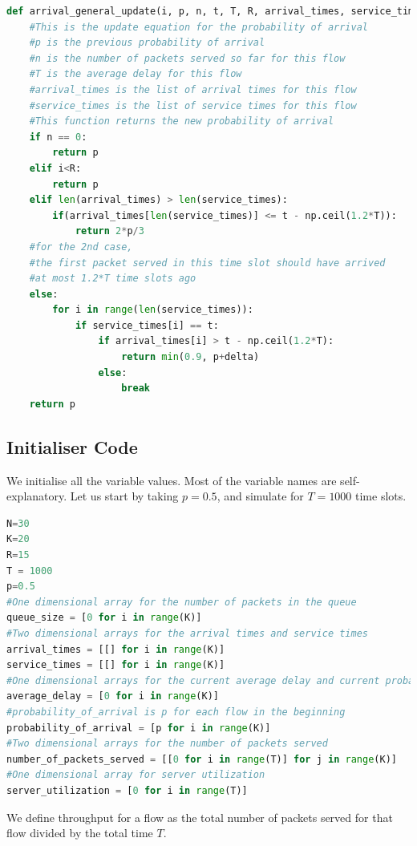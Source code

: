 \documentclass[11pt, a4paper]{article}
\begin{document}
\begin{lstlisting}[language = Python]
def arrival_general_update(i, p, n, t, T, R, arrival_times, service_times, delta):
    #This is the update equation for the probability of arrival
    #p is the previous probability of arrival
    #n is the number of packets served so far for this flow
    #T is the average delay for this flow
    #arrival_times is the list of arrival times for this flow
    #service_times is the list of service times for this flow
    #This function returns the new probability of arrival
    if n == 0:
        return p
    elif i<R:
        return p
    elif len(arrival_times) > len(service_times):
        if(arrival_times[len(service_times)] <= t - np.ceil(1.2*T)):
            return 2*p/3
    #for the 2nd case,
    #the first packet served in this time slot should have arrived 
    #at most 1.2*T time slots ago
    else:
        for i in range(len(service_times)):
            if service_times[i] == t:
                if arrival_times[i] > t - np.ceil(1.2*T):
                    return min(0.9, p+delta)
                else:
                    break
    return p
\end{lstlisting}



\subsection{Initialiser Code}
We initialise all the variable values. Most of the variable names are self-explanatory. Let us start by taking $p=0.5$, and simulate for $T=1000$ time slots.


\begin{lstlisting}[language = Python]
N=30
K=20
R=15
T = 1000
p=0.5
#One dimensional array for the number of packets in the queue
queue_size = [0 for i in range(K)]
#Two dimensional arrays for the arrival times and service times
arrival_times = [[] for i in range(K)]
service_times = [[] for i in range(K)]
#One dimensional arrays for the current average delay and current probability of arrival
average_delay = [0 for i in range(K)]
#probability_of_arrival is p for each flow in the beginning
probability_of_arrival = [p for i in range(K)]
#Two dimensional arrays for the number of packets served 
number_of_packets_served = [[0 for i in range(T)] for j in range(K)]
#One dimensional array for server utilization 
server_utilization = [0 for i in range(T)]
\end{lstlisting}

We define throughput for a flow as the total number of packets served for that flow divided by the total time $T$.
\end{document}
